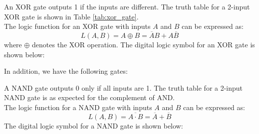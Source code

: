 \documentclass[11pt]{report}
\begin{document}
\begin{definition}
    An XOR gate outputs 1 if the inputs are different. The truth table for a 2-input XOR gate is shown in Table \ref{tab:xor_gate}.
    \\
    The logic function for an XOR gate with inputs $A$ and $B$ can be expressed as:
    $$
        L(A, B) = A \oplus B = \overline{A}B + A\overline{B}
    $$
    where $\oplus$ denotes the XOR operation.
    The digital logic symbol for an XOR gate is shown below:
    \begin{center}
    \end{center}
\end{definition}


In addition, we have the following gates:
\begin{definition}
    A NAND gate outputs 0 only if all inputs are 1. The truth table for a 2-input NAND gate is as expected for the complement of AND.
    \\
    The logic function for a NAND gate with inputs $A$ and $B$ can be expressed as:
    $$
        L(A, B) = \overline{A \cdot B} = \overline{A} + \overline{B}
    $$
    The digital logic symbol for a NAND gate is shown below:
    \begin{center}
    \end{center}
\end{definition}
\end{document}
